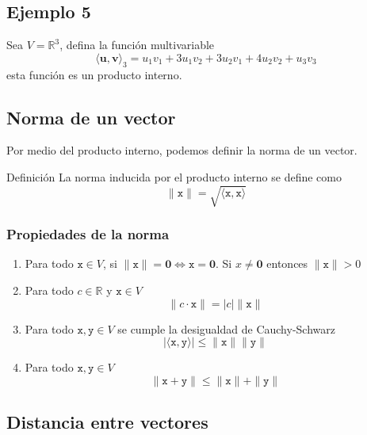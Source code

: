 \documentclass[
]{article}
\begin{document}
\hypertarget{ejemplo-5}{%
\subsection{Ejemplo 5}\label{ejemplo-5}}

Sea \(V=\mathbb{R}^3\), defina la función multivariable \[
\langle \mathbf{u}, \mathbf{v}\rangle_3 = u_1v_1 + 3u_1v_2 + 3u_2v_1 + 4u_2v_2 + u_3v_3
\] esta función es un producto interno.

\hypertarget{norma-de-un-vector}{%
\subsection{Norma de un vector}\label{norma-de-un-vector}}

Por medio del producto interno, podemos definir la norma de un vector.

Definición La norma inducida por el producto interno se define como
\begin{equation}
    \|\mathtt{x}\| = \sqrt{\langle \mathtt{x}, \mathtt{x}  \rangle}
  \end{equation}

\hypertarget{propiedades-de-la-norma}{%
\subsubsection{Propiedades de la norma}\label{propiedades-de-la-norma}}

\begin{enumerate}
\def\labelenumi{\alph{enumi})}
\item
  Para todo \(\mathtt{x}\in V\), si
  \(\|\mathtt{x}\|= \mathbf{0} \Leftrightarrow \mathtt{x}=\mathbf{0}\).
  Si \(x\ne \mathbf{0}\) entonces \(\|\mathtt{x}\| > 0\)
\item
  Para todo \(c\in \mathbb{R}\) y \(\mathtt{x}\in V\) \[
  \|c\cdot \mathtt{x}\| = |c|\|\mathtt{x}\|
  \]
\item
  Para todo \(\mathtt{x},\mathtt{y}\in V\) se cumple la desigualdad de
  Cauchy-Schwarz \[
  |\langle \mathtt{x},\mathtt{y} \rangle|\leq \|\mathtt{x} \|\|\mathtt{y} \|
  \]
\item
  Para todo \(\mathtt{x},\mathtt{y}\in V\) \[
  \|\mathtt{x}+\mathtt{y}\|\leq \|\mathtt{x}\| + \|\mathtt{y}\|
  \]
\end{enumerate}

\hypertarget{distancia-entre-vectores}{%
\subsection{Distancia entre vectores}\label{distancia-entre-vectores}}
\end{document}
